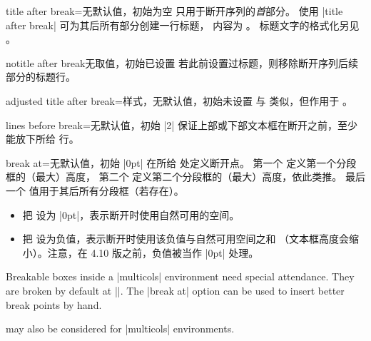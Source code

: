 \begin{docTcbKey}[][doc updated=2018-07-26]{title after break}{=}{无默认值，初始为空}
   只用于断开序列的\emph{首}部分。
  使用 |title after break| 可为其后所有部分创建一行标题，
  内容为 。
  标题文字的格式化另见 。
\end{docTcbKey}


\begin{docTcbKey}{notitle after break}{}{无取值，初始已设置}
  若此前设置过标题，则移除断开序列后续部分的标题行。
\end{docTcbKey}


\begin{docTcbKey}{adjusted title after break}{=}{样式，无默认值，初始未设置}
  与  类似，但作用于
  。
\end{docTcbKey}


\begin{docTcbKey}{lines before break}{=}{无默认值，初始 |2|}
  保证上部或下部文本框在断开之前，至少能放下所给  行。
\end{docTcbKey}

\clearpage
\begin{docTcbKey}[][doc updated=2017-07-05]{break at}{=}{无默认值，初始 |0pt|}
  在所给  处定义断开点。
  第一个  定义第一个分段框的（最大）高度，
  第二个  定义第二个分段框的（最大）高度，依此类推。
  最后一个  值用于其后所有分段框（若存在）。
  \begin{itemize}
  \item 把  设为 |0pt|，表示断开时使用自然可用的空间。
  \item 把  设为负值，表示断开时使用该负值与自然可用空间之和
        （文本框高度会缩小）。注意，在 4.10 版之前，负值被当作 |0pt| 处理。
  \end{itemize}
\begin{dispExample}
\begin{multicols}{3}\footnotesize
Breakable boxes inside a |multicols| environment need special attendance.
They are broken by default at |\textheight|.
The |break at| option can be used to insert better break points by hand.
\begin{tcolorbox}[enhanced jigsaw,size=small,vfill before first,
  colframe=red,colback=yellow!10!white,before title=\raggedright,
  title={Broken box inside a |multicols| environment},fonttitle=\bfseries,
  enforce breakable,%
  pad at break=1mm,break at=3cm/6.3cm ]
\lipsum[1]
\end{tcolorbox}
 may also be considered for |multicols| environments.
\end{multicols}
\end{dispExample}
\end{docTcbKey}

